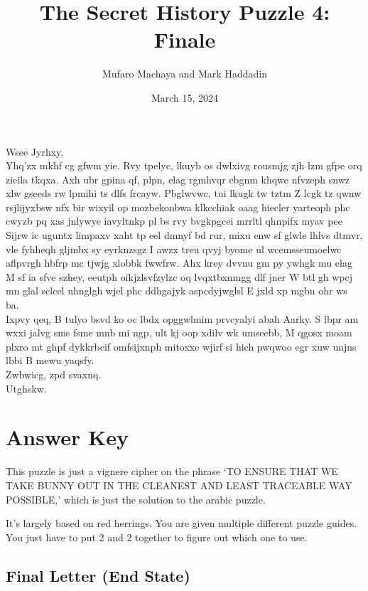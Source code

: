 \documentclass[11pt]{article}
\title{The Secret History Puzzle 4: Finale}
\author{Mufaro Machaya and Mark Haddadin}
\date{March 15, 2024}
\begin{document}
\begin{titlingpage}
\maketitle
\end{titlingpage}

Wsee Jyrhxy, \\

Yhq'zx mkhf cg gfwm yie. Rvy tpelyc, lkuyb os dwlxivg rousmjg zjh lzm gfpe orq zieila tkqxa. Axh ubr gpina qf, plpn, elag rgmhvqr ebgnm khqwe nfvzeph snwz xlw gseeds rw lpmihi ts dlfs frcayw. Pbglwvwc, tui lkugk tw tztm Z lcgk tz qwnw rsjlijyxbsw nfx bir wixyil op mozbekonbwa klkcchiak oaag hiecler yarteoph phc cwyzb pq xas jnlywye iavyltnkp pl bs rvy bvgkpgcei mrrltl qhnpifx myav pee Sijrw ic uguntx limpaxv xaht tp eel dmnyf bd rur, mixu enw sf glwle lhlvs dtmvr, vle fyhheqh gljmbx sy eyrknzsgz I awzx treu qvyj byome ul wcemsseumoelwc aflpvrgh hbfrp mc tjwjg xlobbk fwwfrw. Ahx krey dvvnu gm py ywhgk mu elag M sf ia sfve szhey, eeutph oikjzlsvfzylzc oq lvqxtbxnmgg dlf jner W btl gh wpcj mn glal sclcel uhnglgh wjel phc ddhgajyk aspcdyjwglsl E jxld xp mgbn ohr ws ba. \\

Ixpvy qeq, B tulyo bsvd ko oc lbdx opggwlmim prvcyalyi abah Aarky. S lbpr am wxxi jalvg sms fsme mnb mi ngp, ult kj oop xdilv wk umseebb, M qgosx moam plxro mt ghpf dykkrbcif omfsijxnph mitoxxe wjirf si hich pwqwoo egr xuw unjns lbbi B mewu yaqsfy. \\

Zwbwicg, zpd svaxnq. \\

Utghskw.

\newpage

\section*{Answer Key}

This puzzle is just a vignere cipher on the phrase `TO ENSURE THAT WE TAKE BUNNY OUT IN THE CLEANEST AND LEAST TRACEABLE WAY POSSIBLE,' which is just the solution to the arabic puzzle.

It's largely based on red herrings. You are given multiple different puzzle guides. You just have to put 2 and 2 together to figure out which one to use.

\subsection*{Final Letter (End State)}
\end{document}
